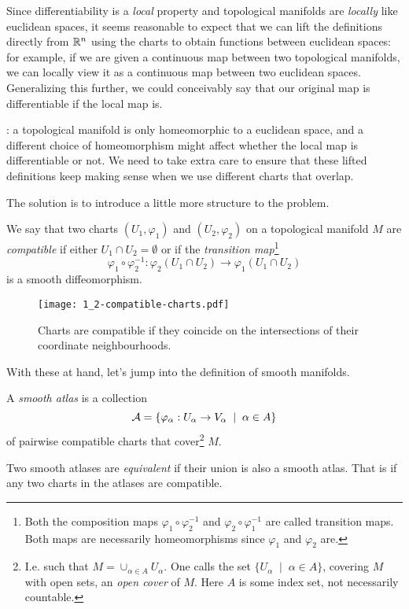 Since differentiability is a \emph{local} property and topological manifolds are \emph{locally} like euclidean spaces, it seems reasonable to expect that we can lift the definitions directly from $\mathbb{R}^n$ using the charts to obtain functions between euclidean spaces:
for example, if we are given a continuous map between two topological manifolds, we can locally view it as a continuous map between two euclidean spaces.
Generalizing this further, we could conceivably say that our original map is differentiable if the local map is.

: a topological manifold is only homeomorphic to a euclidean space, and a different choice of homeomorphism might affect whether the local map is differentiable or not.
We need to take extra care to ensure that these lifted definitions keep making sense when we use different charts that overlap.

The solution is to introduce a little more structure to the problem.

\begin{definition}\label{def:crcomp}
	We say that two charts $(U_1, \varphi_1)$ and $(U_2, \varphi_2)$ on a topological manifold $M$ are \emph{compatible} if either $U_1 \cap U_2 = \emptyset$ or if the \emph{transition map}\footnote{Both the composition maps $\varphi_1 \circ \varphi_2^{-1}$ and $\varphi_2 \circ \varphi_1^{-1}$ are called transition maps. Both maps are necessarily homeomorphisms since $\varphi_1$ and $\varphi_2$ are.}
	\begin{equation}
		\varphi_1 \circ \varphi_2^{-1} : \varphi_2(U_1\cap U_2) \to \varphi_1(U_1 \cap U_2)
	\end{equation}
	is a smooth diffeomorphism.
\end{definition}

\begin{figure*}[htp]
	\centering
	\texttt{[image: 1\_2-compatible-charts.pdf]}
	\caption{Charts are compatible if they coincide on the intersections of their coordinate neighbourhoods.}
	\label{fig:1.2-compatible-charts}
\end{figure*}

With these at hand, let's jump into the definition of smooth manifolds.

\begin{definition}\label{def:cratlas}
	A \emph{smooth atlas} is a collection
	\begin{equation}
		\mathcal{A} = \{\varphi_\alpha: U_\alpha \to V_\alpha \;\mid\; \alpha\in A\}
	\end{equation}
	of pairwise compatible charts that cover\footnote{I.e. such that $M = \cup_{\alpha\in A} U_\alpha$. One calls the set $\{U_\alpha \;\mid\; \alpha\in A\}$, covering $M$ with open sets, an \emph{open cover} of $M$. Here $A$ is some index set, not necessarily countable.} $M$.

	Two smooth atlases are \emph{equivalent} if their union is also a smooth atlas. That is if any two charts in the atlases are compatible.
\end{definition}

